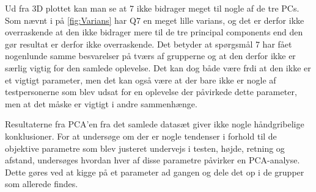 Ud fra 3D plottet kan man se at 7 ikke bidrager meget til nogle af de tre PCs. Som nævnt i  på \autoref{fig:Varians} har Q7 en meget lille varians, og det er derfor ikke overraskende at den ikke bidrager mere til de tre principal components end den gør resultat er derfor ikke overraskende. Det betyder at spørgsmål 7 har fået nogenlunde samme besvarelser på tværs af grupperne og at den derfor ikke er særlig vigtig for den samlede oplevelse. Det kan dog både være frdi at den ikke er et vigtigt parameter, men det kan også være at der bare ikke er nogle af testpersonerne som blev udsat for en oplevelse der påvirkede dette parameter, men at det måske er vigtigt i andre sammenhænge. 


Resultaterne fra PCA'en fra det samlede datasæt giver ikke nogle håndgribelige konklusioner. For at undersøge om der er nogle tendenser i forhold til de objektive parametre som blev justeret undervejs i testen, højde, retning og afstand, undersøges hvordan hver af disse parametre påvirker en PCA-analyse. Dette gøres ved at kigge på et parameter ad gangen og dele det op i de grupper som allerede findes.